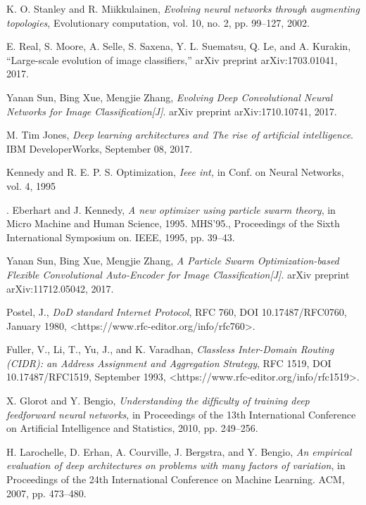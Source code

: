 \documentclass[conference]{IEEEtran}
\begin{document}
\begin{thebibliography}{}
K. O. Stanley and R. Miikkulainen, \emph{Evolving neural networks through augmenting topologies}, Evolutionary computation, vol. 10, no. 2, pp. 99–127, 2002.

E. Real, S. Moore, A. Selle, S. Saxena, Y. L. Suematsu, Q. Le, and A. Kurakin, “Large-scale evolution of image classiﬁers,” arXiv preprint arXiv:1703.01041, 2017. 

Yanan Sun, Bing Xue, Mengjie Zhang, \emph{Evolving Deep Convolutional Neural Networks for Image Classification[J]}. arXiv preprint arXiv:1710.10741, 2017.

M. Tim Jones, \emph{Deep learning architectures and The rise of artificial intelligence}. IBM DeveloperWorks, September 08, 2017.

Kennedy and R. E. P. S. Optimization, \emph{Ieee int,} in Conf. on Neural Networks, vol. 4, 1995

. Eberhart and J. Kennedy, \emph{A new optimizer using particle swarm theory}, in Micro Machine and Human Science, 1995. MHS’95., Proceedings of the Sixth International Symposium on.  IEEE, 1995, pp. 39–43.

Yanan Sun, Bing Xue, Mengjie Zhang, \emph{A Particle Swarm Optimization-based Flexible Convolutional Auto-Encoder for Image Classification[J]}. arXiv preprint arXiv:11712.05042, 2017. 

Postel, J., \emph{DoD standard Internet Protocol}, RFC 760, DOI 10.17487/RFC0760, January 1980, <https://www.rfc-editor.org/info/rfc760>.

Fuller, V., Li, T., Yu, J., and K. Varadhan, \emph{Classless Inter-Domain Routing (CIDR): an Address Assignment and Aggregation Strategy}, RFC 1519, DOI 10.17487/RFC1519, September 1993, <https://www.rfc-editor.org/info/rfc1519>.

X. Glorot and Y. Bengio, \emph{Understanding the difﬁculty of training deep feedforward neural networks}, in Proceedings of the 13th International Conference on Artiﬁcial Intelligence and Statistics, 2010, pp. 249–256. 

H. Larochelle, D. Erhan, A. Courville, J. Bergstra, and Y. Bengio, \emph{An empirical evaluation of deep architectures on problems with many factors of variation}, in Proceedings of the 24th International Conference on Machine Learning. ACM, 2007, pp. 473–480.


\end{thebibliography}
\end{document}
